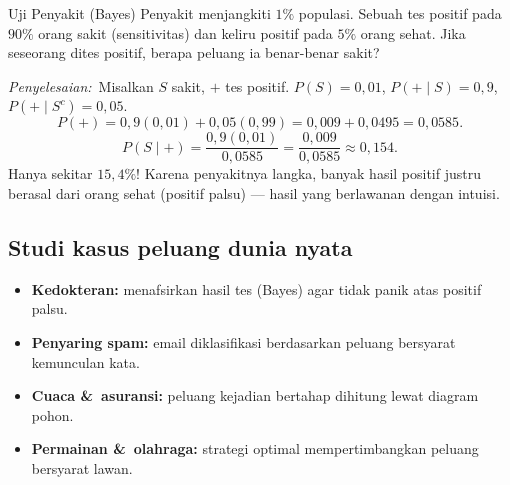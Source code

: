 \documentclass[11pt,a4paper]{report}
\theoremstyle{gaya}
\newcommand{\jawab}{\par\smallskip\noindent\textit{\textcolor{oranye}{Penyelesaian:}}\ }
\begin{document}
\begin{contoh}{Uji Penyakit (Bayes)}
Penyakit menjangkiti $1\%$ populasi. Sebuah tes positif pada $90\%$ orang sakit (sensitivitas) dan keliru positif pada $5\%$ orang sehat. Jika seseorang dites positif, berapa peluang ia benar-benar sakit?

\jawab Misalkan $S$ sakit, $+$ tes positif. $P(S)=0{,}01$, $P(+\mid S)=0{,}9$, $P(+\mid S^c)=0{,}05$.
\[
P(+)=0{,}9(0{,}01)+0{,}05(0{,}99)=0{,}009+0{,}0495=0{,}0585.
\]
\[
P(S\mid +)=\frac{0{,}9(0{,}01)}{0{,}0585}=\frac{0{,}009}{0{,}0585}\approx0{,}154.
\]
Hanya sekitar $15{,}4\%$! Karena penyakitnya langka, banyak hasil positif justru berasal dari orang sehat (positif palsu) --- hasil yang berlawanan dengan intuisi.
\end{contoh}

\subsection*{Studi kasus peluang dunia nyata}
\begin{dunianyata}
\begin{itemize}[leftmargin=*,topsep=2pt]
  \item \textbf{Kedokteran:} menafsirkan hasil tes (Bayes) agar tidak panik atas positif palsu.
  \item \textbf{Penyaring spam:} email diklasifikasi berdasarkan peluang bersyarat kemunculan kata.
  \item \textbf{Cuaca \&\ asuransi:} peluang kejadian bertahap dihitung lewat diagram pohon.
  \item \textbf{Permainan \&\ olahraga:} strategi optimal mempertimbangkan peluang bersyarat lawan.
\end{itemize}
\end{dunianyata}
\end{document}
